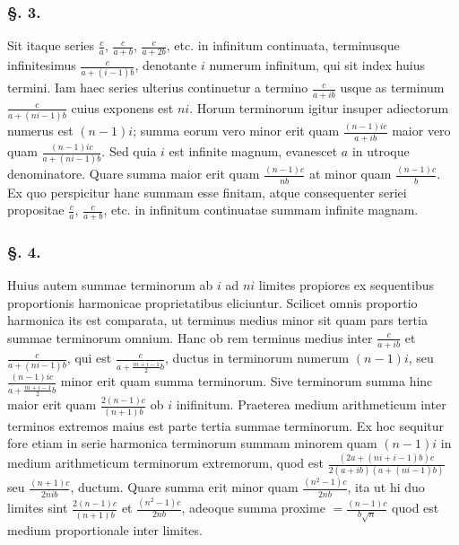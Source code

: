 \documentclass[12pt, letterpaper]{article}
\begin{document}
\subsubsection*{\S. 3.}
Sit itaque series $\frac{c}{a}$, $\frac{c}{a+b}$, $\frac{c}{a+2b}$, etc. in
infinitum continuata, terminusque infinitesimus $\frac{c}{a+(i-1)b}$,
denotante $i$ numerum infinitum, qui sit index huius termini.
Iam haec series ulterius continuetur a termino $\frac{c}{a+ib}$
usque as terminum $\frac{c}{a+(ni-1)b}$ cuius exponens est
$ni$. Horum terminorum igitur insuper adiectorum numerus
est $(n-1)i$; summa eorum vero minor erit quam $\frac{(n-1)ic}{a+ib}$
maior vero quam $\frac{(n-1)ic}{a+(ni-1)b}$. Sed quia $i$
est infinite magnum, evanescet $a$ in utroque denominatore.
Quare summa maior erit quam $\frac{(n-1)c}{nb}$ at minor
quam $\frac{(n-1)c}{b}$. Ex quo perspicitur hanc summam esse
finitam, atque consequenter seriei propositae $\frac{c}{a}$, $\frac{c}{a+b}$,
etc. in infinitum continuatae summam infinite magnam.

\subsubsection*{\S. 4.}
Huius autem summae terminorum ab $i$ ad
$ni$ limites propiores ex sequentibus proportionis harmonicae
proprietatibus eliciuntur. Scilicet omnis proportio
harmonica its est comparata, ut terminus medius minor
sit quam pars tertia summae terminorum omnium. Hanc
ob rem terminus medius inter $\frac{c}{a+ib}$ et $\frac{c}{a+(ni-1)b}$, qui est
$\frac{c}{a+\frac{ni+i-1}{2}b}$, ductus in terminorum numerum $(n-1)i$,
seu $\frac{(n-1)ic}{a+\frac{ni+i-1}{2}b}$ minor erit quam summa terminorum.
Sive terminorum summa hinc maior erit quam
$\frac{2(n-1)c}{(n+1)b}$ ob $i$ inifinitum. Praeterea medium arithmeticum
inter terminos extremos maius est parte tertia
summae terminorum. Ex hoc sequitur fore etiam in
serie harmonica terminorum summam minorem quam
$(n-1)i$ in medium arithmeticum terminorum extremorum,
quod est $\frac{(2a+(ni+i-1)b)c}{2(a+ib)(a+(ni-1)b)}$ seu $\frac{(n+1)c}{2nib}$,
ductum. Quare summa erit minor quam $\frac{(n^2 - 1)c}{2nb}$, ita ut
hi duo limites sint $\frac{2(n-1)c}{(n+1)b}$ et $\frac{(n^2 - 1)c}{2nb}$, adeoque summa
proxime $= \frac{(n-1)c}{b\sqrt{n}}$ quod est medium proportionale inter
limites.
\end{document}
